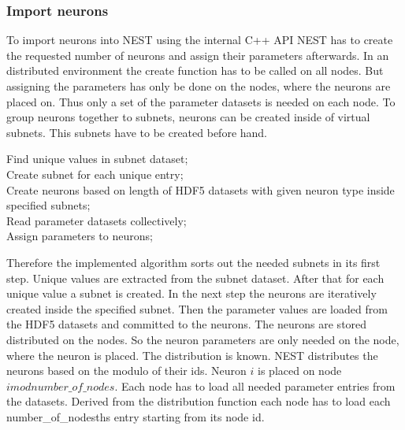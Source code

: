 \subsubsection{Import neurons}
To import neurons into NEST using the internal C++ API NEST has to create the requested number of neurons and
assign their parameters afterwards. In an distributed environment the create function has to be called on all nodes. But assigning the parameters has only be done on the nodes, where the neurons are placed on.
Thus only a set of the parameter datasets is needed on each node.
To group neurons together to subnets, neurons can be created inside of virtual subnets.
This subnets have to be created before hand.
\begin{algorithm}
 Find unique values in subnet dataset; \\
 Create subnet for each unique entry; \\
 Create neurons based on length of HDF5 datasets with given neuron type inside specified subnets; \\
 Read parameter datasets collectively; \\
 Assign parameters to neurons;
\label{alg2}
\caption{}
\end{algorithm}
Therefore the implemented algorithm sorts out the needed subnets in its first step.
Unique values are extracted from the subnet dataset.
After that for each unique value a subnet is created.
In the next step the neurons are iteratively created inside the specified subnet.
Then the parameter values are loaded from the HDF5 datasets and committed to the neurons.
The neurons are stored distributed on the nodes.
So the neuron parameters are only needed on the node, where the neuron is placed.
The distribution is known. NEST distributes the neurons based on the modulo of their ids. Neuron $i$ is placed on node $i mod number\_of\_nodes$. Each node has to load all needed parameter entries
from the datasets. Derived from the distribution function each node has to load each number\_of\_nodesths entry starting from its node id.

\newpage
